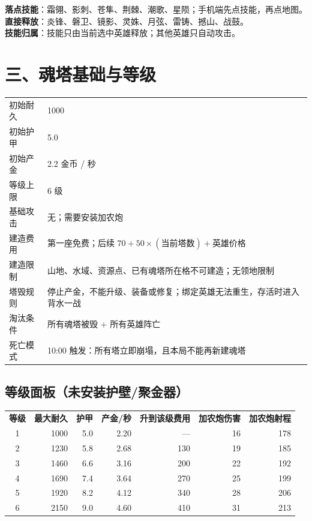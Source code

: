 \documentclass{ctexart}
\begin{document}
\vspace{2pt}
{\footnotesize
\textbf{落点技能}：霜翎、影刺、苍隼、荆棘、潮歌、星陨；手机端先点技能，再点地图。\\
\textbf{直接释放}：炎锋、磐卫、镜影、灵姝、月弦、雷铸、撼山、战鼓。\\
\textbf{技能归属}：技能只由当前选中英雄释放；其他英雄只自动攻击。
}

\newpage

\section*{三、魂塔基础与等级}

{\footnotesize
\begin{tabularx}{\textwidth}{@{}l X@{}}
\toprule
初始耐久 & 1000 \\
初始护甲 & 5.0 \\
初始产金 & 2.2 金币 / 秒 \\
等级上限 & 6 级 \\
基础攻击 & 无；需要安装加农炮 \\
建造费用 & 第一座免费；后续 $70 + 50\times(\text{当前塔数}) + \text{英雄价格}$ \\
建造限制 & 山地、水域、资源点、已有魂塔所在格不可建造；无领地限制 \\
塔毁规则 & 停止产金，不能升级、装备或修复；绑定英雄无法重生，存活时进入背水一战 \\
淘汰条件 & 所有魂塔被毁 + 所有英雄阵亡 \\
死亡模式 & 10:00 触发：所有塔立即崩塌，且本局不能再新建魂塔 \\
\bottomrule
\end{tabularx}
}

\subsection*{等级面板（未安装护壁/聚金器）}

{\footnotesize
\begin{tabularx}{\textwidth}{@{}c r r r r r r@{}}
\rowcolor{teal}\color{white}\bfseries 等级 & \color{white}\bfseries 最大耐久 & \color{white}\bfseries 护甲 & \color{white}\bfseries 产金/秒 & \color{white}\bfseries 升到该级费用 & \color{white}\bfseries 加农炮伤害 & \color{white}\bfseries 加农炮射程 \\
1 & 1000 & 5.0 & 2.20 & — & 16 & 178 \\
2 & 1230 & 5.8 & 2.68 & 130 & 19 & 185 \\
3 & 1460 & 6.6 & 3.16 & 200 & 22 & 192 \\
4 & 1690 & 7.4 & 3.64 & 270 & 25 & 199 \\
5 & 1920 & 8.2 & 4.12 & 340 & 28 & 206 \\
6 & 2150 & 9.0 & 4.60 & 410 & 31 & 213 \\
\end{tabularx}
}
\end{document}
